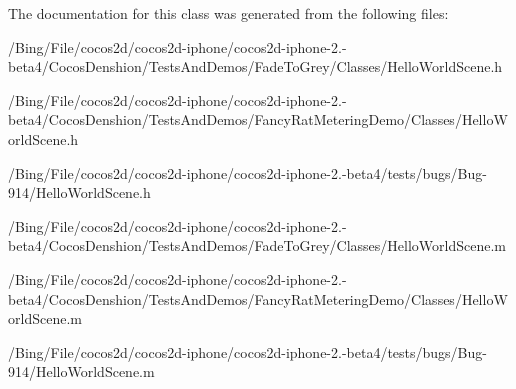 The documentation for this class was generated from the following files\-:\begin{DoxyCompactItemize}
\item 
/\-Bing/\-File/cocos2d/cocos2d-\/iphone/cocos2d-\/iphone-\/2.-\/beta4/\-Cocos\-Denshion/\-Tests\-And\-Demos/\-Fade\-To\-Grey/\-Classes/Hello\-World\-Scene.\-h\item 
/\-Bing/\-File/cocos2d/cocos2d-\/iphone/cocos2d-\/iphone-\/2.-\/beta4/\-Cocos\-Denshion/\-Tests\-And\-Demos/\-Fancy\-Rat\-Metering\-Demo/\-Classes/Hello\-World\-Scene.\-h\item 
/\-Bing/\-File/cocos2d/cocos2d-\/iphone/cocos2d-\/iphone-\/2.-\/beta4/tests/bugs/\-Bug-\/914/Hello\-World\-Scene.\-h\item 
/\-Bing/\-File/cocos2d/cocos2d-\/iphone/cocos2d-\/iphone-\/2.-\/beta4/\-Cocos\-Denshion/\-Tests\-And\-Demos/\-Fade\-To\-Grey/\-Classes/Hello\-World\-Scene.\-m\item 
/\-Bing/\-File/cocos2d/cocos2d-\/iphone/cocos2d-\/iphone-\/2.-\/beta4/\-Cocos\-Denshion/\-Tests\-And\-Demos/\-Fancy\-Rat\-Metering\-Demo/\-Classes/Hello\-World\-Scene.\-m\item 
/\-Bing/\-File/cocos2d/cocos2d-\/iphone/cocos2d-\/iphone-\/2.-\/beta4/tests/bugs/\-Bug-\/914/Hello\-World\-Scene.\-m\end{DoxyCompactItemize}
